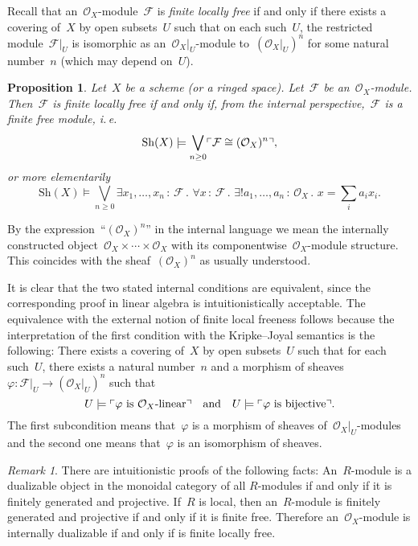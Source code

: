 \documentclass[10pt,reqno,a4paper]{amsbook}
\makeatletter
\theoremstyle{definition}
\theoremstyle{plain}
\newtheorem{prop}[defn]{Proposition}
\theoremstyle{remark}
\newtheorem{rem}[defn]{Remark}
\newcommand{\F}{\mathcal{F}}
\renewcommand{\O}{\mathcal{O}}
\newcommand{\Sh}{\mathrm{Sh}}
\newcommand{\?}{\,{:}\,}
\renewcommand{\_}{\mathpunct{.}\,}
\newcommand{\speak}[1]{\ulcorner\text{\textnormal{#1}}\urcorner}
\newcommand{\ie}{i.\,e.\@\xspace}
\renewenvironment{proof}[1][\proofname]{\par
  \pushQED{\qed}%
  \normalfont \topsep6\p@\@plus6\p@\relax
  \trivlist
  \item[\hskip\labelsep
        \itshape
    #1\@addpunct{.}]\ignorespaces
}{%
  \popQED\endtrivlist\@endpefalse
}
\makeatother
\begin{document}
Recall that an~$\O_X$-module~$\F$ is \emph{finite locally free} if and only
if there exists a covering of~$X$ by open subsets~$U$ such that on each
such~$U$, the restricted module~$\F|_U$ is isomorphic as an~$\O_X|_U$-module
to~$(\O_X|_U)^n$ for some natural number~$n$ (which may depend on~$U$).

\begin{prop}\label{prop:locally-free}
Let~$X$ be a scheme (or a ringed space). Let~$\F$ be
an~$\O_X$-module. Then~$\F$ is finite locally free if and only if, from the
internal perspective,~$\F$ is a finite free module, \ie
\[ \Sh(X) \models \bigvee_{n \geq 0} \speak{$\F \cong (\O_X)^n$}, \]
or more elementarily
\[ \Sh(X) \models \bigvee_{n \geq 0}
  \exists x_1,\ldots,x_n\?\F\_
  \forall x\?\F\_
  \exists! a_1,\ldots,a_n\?\O_X\_
  x = \textstyle\sum\limits_i a_i x_i. \]
\end{prop}
\begin{proof}By the expression~``$(\O_X)^n$'' in the internal language we mean
the internally constructed object~$\O_X \times \cdots \times \O_X$ with its
componentwise~$\O_X$-module structure. This coincides with the sheaf~$(\O_X)^n$ as
usually understood.

It is clear that the two stated internal conditions are equivalent, since the
corresponding proof in linear algebra is intuitionistically acceptable. The equivalence with
the external notion of finite local freeness follows because the
interpretation of the first condition with the Kripke--Joyal semantics is the
following: There exists a covering of~$X$ by open subsets~$U$ such that for
each such~$U$, there exists a natural number~$n$ and a morphism of
sheaves~$\varphi : \F|_U \to (\O_X|_U)^n$ such that
\[ U \models \speak{$\varphi$ is~$\O_X$-linear} \quad\text{and}\quad
  U \models \speak{$\varphi$ is bijective}. \]
The first subcondition means that~$\varphi$ is a morphism of sheaves
of~$\O_X|_U$-modules and the second one means that~$\varphi$ is an isomorphism of
sheaves.
\end{proof}

\begin{rem}There are intuitionistic proofs of the following facts:
An~$R$-module is a dualizable object in the monoidal category of all
$R$-modules if and only if it is finitely generated and projective. If~$R$ is
local, then an~$R$-module is finitely generated and projective if and only if
it is finite free. Therefore an~$\O_X$-module is internally dualizable if and
only if is finite locally free.
\end{rem}
\end{document}
